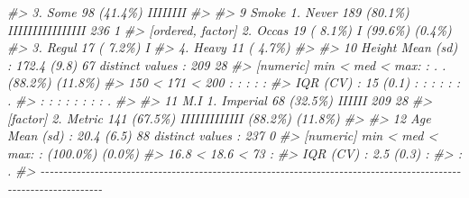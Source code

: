 \documentclass[
]{book}
\newenvironment{Shaded}{\begin{snugshade}}{\end{snugshade}}
\newcommand{\CommentTok}[1]{\textcolor[rgb]{0.56,0.35,0.01}{\textit{#1}}}
\begin{document}
\begin{Shaded}
\begin{Highlighting}[]
\CommentTok{\#\textgreater{}                          3. Some                    98 (41.4\%)          IIIIIIII                                  }
\CommentTok{\#\textgreater{} }
\CommentTok{\#\textgreater{} 9    Smoke               1. Never                  189 (80.1\%)          IIIIIIIIIIIIIIII      236        1        }
\CommentTok{\#\textgreater{}      [ordered, factor]   2. Occas                   19 ( 8.1\%)          I                     (99.6\%)    (0.4\%)   }
\CommentTok{\#\textgreater{}                          3. Regul                   17 ( 7.2\%)          I                                         }
\CommentTok{\#\textgreater{}                          4. Heavy                   11 ( 4.7\%)                                                    }
\CommentTok{\#\textgreater{} }
\CommentTok{\#\textgreater{} 10   Height              Mean (sd) : 172.4 (9.8)   67 distinct values         :               209        28       }
\CommentTok{\#\textgreater{}      [numeric]           min \textless{} med \textless{} max:                                     : . .           (88.2\%)    (11.8\%)  }
\CommentTok{\#\textgreater{}                          150 \textless{} 171 \textless{} 200                                    : : : : :                             }
\CommentTok{\#\textgreater{}                          IQR (CV) : 15 (0.1)                              : : : : : : .                           }
\CommentTok{\#\textgreater{}                                                                         : : : : : : : : .                         }
\CommentTok{\#\textgreater{} }
\CommentTok{\#\textgreater{} 11   M.I                 1. Imperial                68 (32.5\%)          IIIIII                209        28       }
\CommentTok{\#\textgreater{}      [factor]            2. Metric                 141 (67.5\%)          IIIIIIIIIIIII         (88.2\%)    (11.8\%)  }
\CommentTok{\#\textgreater{} }
\CommentTok{\#\textgreater{} 12   Age                 Mean (sd) : 20.4 (6.5)    88 distinct values   :                     237        0        }
\CommentTok{\#\textgreater{}      [numeric]           min \textless{} med \textless{} max:                               :                     (100.0\%)   (0.0\%)   }
\CommentTok{\#\textgreater{}                          16.8 \textless{} 18.6 \textless{} 73                               :                                         }
\CommentTok{\#\textgreater{}                          IQR (CV) : 2.5 (0.3)                           :                                         }
\CommentTok{\#\textgreater{}                                                                         : .                                       }
\CommentTok{\#\textgreater{} {-}{-}{-}{-}{-}{-}{-}{-}{-}{-}{-}{-}{-}{-}{-}{-}{-}{-}{-}{-}{-}{-}{-}{-}{-}{-}{-}{-}{-}{-}{-}{-}{-}{-}{-}{-}{-}{-}{-}{-}{-}{-}{-}{-}{-}{-}{-}{-}{-}{-}{-}{-}{-}{-}{-}{-}{-}{-}{-}{-}{-}{-}{-}{-}{-}{-}{-}{-}{-}{-}{-}{-}{-}{-}{-}{-}{-}{-}{-}{-}{-}{-}{-}{-}{-}{-}{-}{-}{-}{-}{-}{-}{-}{-}{-}{-}{-}{-}{-}{-}{-}{-}{-}{-}{-}{-}{-}{-}{-}{-}{-}{-}{-}{-}}
\end{Highlighting}
\end{Shaded}
\end{document}
